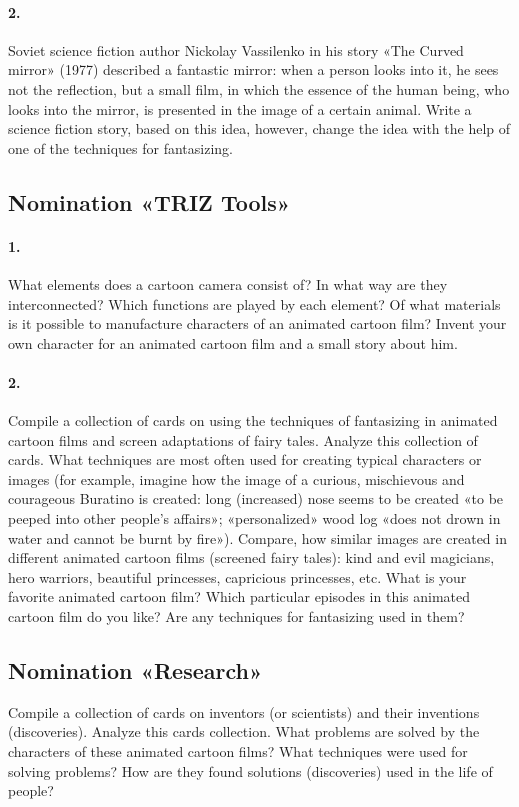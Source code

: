 \documentclass[11pt,a4paper]{article}
\begin{document}
\paragraph{2.}
Soviet science fiction author Nickolay Vassilenko in his story «The Curved
mirror» (1977) described a fantastic mirror: when a person looks into it, he
sees not the reflection, but a small film, in which the essence of the human
being, who looks into the mirror, is presented in the image of a certain
animal. Write a science fiction story, based on this idea, however, change the
idea with the help of one of the techniques for fantasizing.

\subsection*{Nomination «TRIZ Tools»}

\paragraph{1.}
What elements does a cartoon camera consist of? In what way are they
interconnected? Which functions are played by each element? Of what materials
is it possible to manufacture characters of an animated cartoon film? Invent
your own character for an animated cartoon film and a small story about him.

\paragraph{2.}
Compile a collection of cards on using the techniques of fantasizing in
animated cartoon films and screen adaptations of fairy tales. Analyze this
collection of cards. What techniques are most often used for creating typical
characters or images (for example, imagine how the image of a curious,
mischievous and courageous Buratino is created: long (increased) nose seems to
be created «to be peeped into other people’s affairs»; «personalized» wood log
«does not drown in water and cannot be burnt by fire»). Compare, how similar
images are created in different animated cartoon films (screened fairy tales):
kind and evil magicians, hero warriors, beautiful princesses, capricious
princesses, etc. What is your favorite animated cartoon film? Which particular
episodes in this animated cartoon film do you like? Are any techniques for
fantasizing used in them?

\subsection*{Nomination «Research»}
Compile a collection of cards on inventors (or scientists) and their
inventions (discoveries). Analyze this cards collection. What problems are
solved by the characters of these animated cartoon films? What techniques were
used for solving problems? How are they found solutions (discoveries) used in
the life of people?
\end{document}
